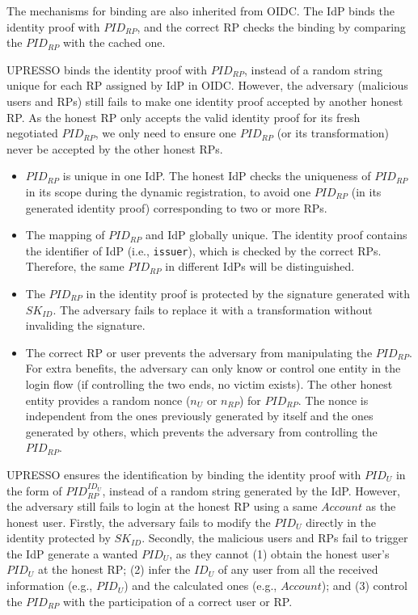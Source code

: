 The mechanisms for binding are also inherited from OIDC. The IdP binds the identity proof with $PID_{RP}$, and the correct RP checks the binding by comparing the $PID_{RP}$ with the cached one.

UPRESSO binds the identity proof with $PID_{RP}$, instead of a random string unique for each RP assigned by IdP in OIDC. However, the adversary (malicious users and RPs) still fails to  make one identity proof 
accepted by another honest RP. As the honest RP only accepts the valid identity proof for its fresh negotiated $PID_{RP}$, we only need to ensure one $PID_{RP}$ (or its transformation) never be accepted by the other honest RPs.
\begin{itemize}
\item $PID_{RP}$ is unique in one IdP. The honest IdP checks the uniqueness of $PID_{RP}$ in its scope during the dynamic registration, to avoid one $PID_{RP}$ (in its generated identity proof) corresponding to two or more RPs.
\item The mapping of $PID_{RP}$ and IdP globally unique. The identity proof contains the identifier of IdP (i.e., \verb+issuer+), which is checked by the correct RPs. Therefore, the same $PID_{RP}$ in different IdPs will be distinguished.
\item The $PID_{RP}$ in the identity proof is protected by the signature generated with $SK_{ID}$. The adversary fails to replace it with a transformation without invaliding the signature.
\item The correct RP or user prevents the adversary from manipulating the $PID_{RP}$. For extra benefits, the adversary can only know or control one entity in the login flow (if controlling the two ends, no victim exists). The other honest entity provides a random nonce ($n_U$ or $n_{RP}$) for $PID_{RP}$. The nonce is independent from the ones previously generated by itself  and the ones generated by others, which prevents the adversary from controlling the $PID_{RP}$.

\end{itemize}

UPRESSO ensures the identification by binding the identity proof with $PID_U$  in the form of $PID_{RP}^{ID_U}$, instead of a random string generated by the IdP. However, the adversary still fails to login at the honest RP using a same $Account$ as the honest user. Firstly, the adversary fails to  modify the $PID_U$ directly in the identity protected by $SK_{ID}$. Secondly, the malicious users and RPs fail to trigger the IdP generate a wanted $PID_U$, as they cannot (1) obtain the honest user's $PID_U$ at the honest RP; (2) infer the $ID_U$ of any user from all the received  information (e.g., $PID_U$) and the calculated ones (e.g., $Account$); and (3) control the $PID_{RP}$ with the participation of a correct user or RP.

